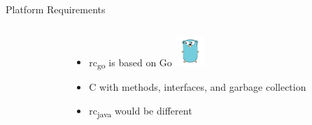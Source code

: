 \documentclass{beamer}
\newcommand{\rcgo}{rc\textsubscript{go}}
\begin{document}
\begin{frame}{Platform Requirements}
  \vspace*{-20pt}

  \begin{columns}
    \begin{column}{.5\textwidth}
    \end{column}
    \begin{column}{.5\textwidth}
      \begin{itemize}
      \item \rcgo{} is based on Go \includegraphics[height=32pt]{gopher.png}
      \item C with methods, interfaces, and garbage collection
      \item rc\textsubscript{java} would be different
      \end{itemize}
    \end{column}
  \end{columns}


\end{frame}
\end{document}
